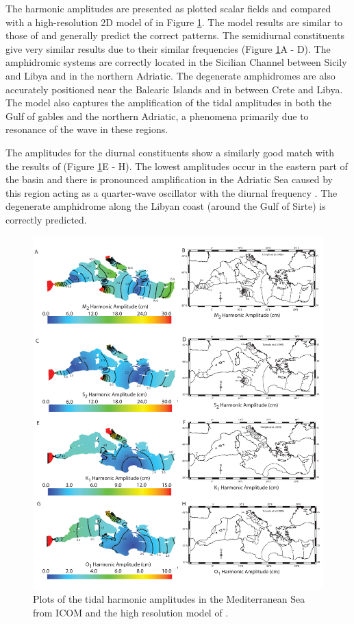 The harmonic amplitudes are presented as plotted scalar fields and compared with a high-resolution 2D model of \citet{Tsimplis1995} in
Figure \ref{amp}. The model results are similar to those of \citet{Tsimplis1995} and generally predict the correct patterns. 
The semidiurnal constituents give very similar results due to their similar frequencies (Figure \ref{amp}A - D). The amphidromic
systems are correctly located in the Sicilian Channel between Sicily and Libya     
and in the northern Adriatic. The degenerate amphidromes are also accurately positioned near the Balearic Islands and in between
Crete and Libya. The model also captures the amplification of the tidal amplitudes in both the Gulf of gables and the northern Adriatic, 
a phenomena primarily due to resonance of the wave in these regions.

The amplitudes for the diurnal constituents show a similarly good match with the results of \citet{Tsimplis1995} (Figure \ref{amp}E - H).
The lowest amplitudes occur in the eastern part of the basin and there is pronounced amplification in the Adriatic Sea caused by this region
acting as a quarter-wave oscillator with the diurnal frequency \citep{Wells2008}. The degenerate amphidrome
along the Libyan coast (around the Gulf of Sirte) is correctly predicted.   

\begin{figure}[t!]
\centering
\includegraphics[width=\textwidth]{./examples_images/tides_in_the_Mediterranean_Sea/amp.pdf}
\caption{Plots of the tidal harmonic amplitudes in the Mediterranean Sea from ICOM and the high resolution
model of \citet{Tsimplis1995}.}
\label{amp}
\end{figure}

